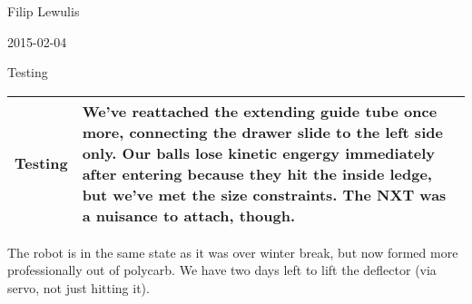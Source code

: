 Filip Lewulis

2015-02-04

Testing

\begin{tabular}{|p{5cm}|p{5cm}|}
  \hline Testing &
We've reattached the extending guide tube once more, connecting the drawer slide to the left side only. Our balls lose kinetic engergy immediately after entering because they hit the inside ledge, but we've met the size constraints. The NXT was a nuisance to attach, though. \\
\hline
\end{tabular}

The robot is in the same state as it was over winter break, but now formed more professionally out of polycarb. We have two days left to lift the deflector (via servo, not just hitting it).
